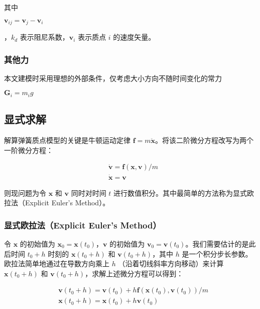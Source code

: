 \documentclass[UTF8]{ctexart}
\begin{document}
其中 \begin{large}$\mathbf{v}_{ij} = \mathbf{v}_j - \mathbf{v}_i$\end{large}，$k_d$ 表示阻尼系数，$\mathbf{v}_i$ 表示质点 $i$ 的速度矢量。 \par

\subsubsection{其他力}

本文建模时采用理想的外部条件，仅考虑大小方向不随时间变化的常力 \begin{large}$\mathbf{G}_i = m_i g$\end{large} \par

\subsection{显式求解}

解算弹簧质点模型的关键是牛顿运动定律 $\mathbf{f} = m \ddot{\mathbf{x}}$。将该二阶微分方程改写为两个一阶微分方程：

\begin{large}
\begin{equation}
\begin{split}
&\dot{\mathbf{v}} = \mathbf{f}(\mathbf{x}, \mathbf{v}) / m \\
&\dot{\mathbf{x}} = \mathbf{v}
\end{split}
\end{equation}
\end{large}

则现问题为令 $\mathbf{x}$ 和 $\mathbf{v}$ 同时对时间 $t$ 进行数值积分。其中最简单的方法称为显式欧拉法（Explicit Euler's Method）。

\subsubsection{显式欧拉法（Explicit Euler's Method）}

令 $\mathbf{x}$ 的初始值为 $\mathbf{x}_0 = \mathbf{x}(t_0)$，$\mathbf{v}$ 的初始值为 $\mathbf{v}_0 = \mathbf{v}(t_0)$。我们需要估计的是此后时间 $t_0 + h$ 时刻的 $\mathbf{x}(t_0+h)$ 和 $\mathbf{v}(t_0 + h)$，其中 $h$ 是一个积分步长参数。欧拉法简单地通过在导数方向乘上 $h$ （沿着切线斜率方向移动）来计算 $\mathbf{x}(t_0+h)$ 和 $\mathbf{v}(t_0 + h)$，求解上述微分方程可以得到：

\begin{large}
\begin{equation}
\begin{split}
& \mathbf{v}(t_0 + h) = \mathbf{v}(t_0) + h \mathbf{f}(\mathbf{x}(t_0), \mathbf{v}(t_0)) / m \\
& \mathbf{x}(t_0 + h) = \mathbf{x}(t_0) + h \mathbf{v} (t_0)
\end{split}
\end{equation}
\end{large}
\end{document}

